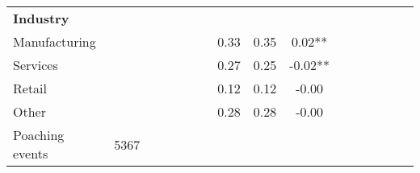 {\begin{tabular}{l*{5}{ccc}}
\\ \textbf{Industry}&            &            &            &            &            &            &            &            &               \\
Manufacturing       &            &            &            &            &            &            &        0.33&        0.35&        0.02** \\
Services            &            &            &            &            &            &            &        0.27&        0.25&       -0.02** \\
Retail              &            &            &            &            &            &            &        0.12&        0.12&       -0.00   \\
Other               &            &            &            &            &            &            &        0.28&        0.28&       -0.00   \\
\midrule
Poaching events     &        5367&            &            &            &            &            &            &            &               \\
\bottomrule
\end{tabular}
}
